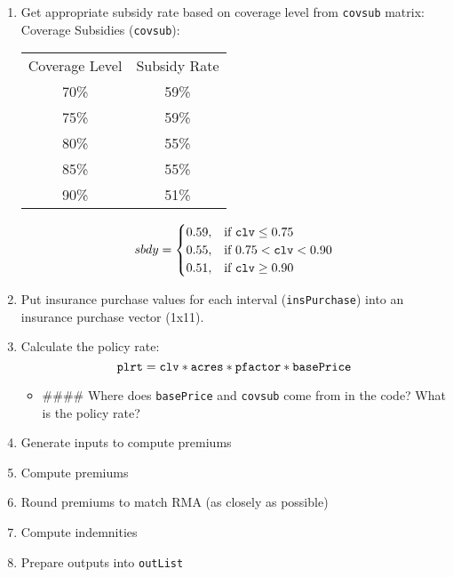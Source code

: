 \documentclass[11pt]{article}
\begin{document}
\begin{enumerate}
\item Get appropriate subsidy rate based on coverage level from \verb!covsub! matrix: 
Coverage Subsidies (\verb!covsub!):
\begin{center}
\begin{tabular}{cc}
\hline
Coverage Level & Subsidy Rate \\
70\% & 59\% \\
75\% & 59\% \\
80\% & 55\% \\
85\% & 55\% \\
90\% & 51\% \\
\hline
\end{tabular}
\end{center}
\begin{equation}
sbdy = 
\begin{cases}
0.59, & \text{if}\ \verb!clv! \le 0.75 \\
0.55, & \text{if}\ 0.75 < \verb!clv! < 0.90 \\
0.51, & \text{if}\ \verb!clv! \ge 0.90 
\end{cases}
\end{equation}

\item Put insurance purchase values for each interval (\verb!insPurchase!) into an insurance purchase vector (1x11). 
\item Calculate the policy rate:
\begin{equation}
\verb!plrt! = \verb!clv! * \verb!acres! * \verb!pfactor! * \verb!basePrice!
\end{equation}
	\begin{itemize}
	\item \#\#\#\# Where does \verb!basePrice! and \verb!covsub! come from in the code? What is the policy rate?
	\end{itemize}
\item Generate inputs to compute premiums
\item Compute premiums
\item Round premiums to match RMA (as closely as possible)
\item Compute indemnities
\item Prepare outputs into \verb!outList!
\end{enumerate}
\end{document}
